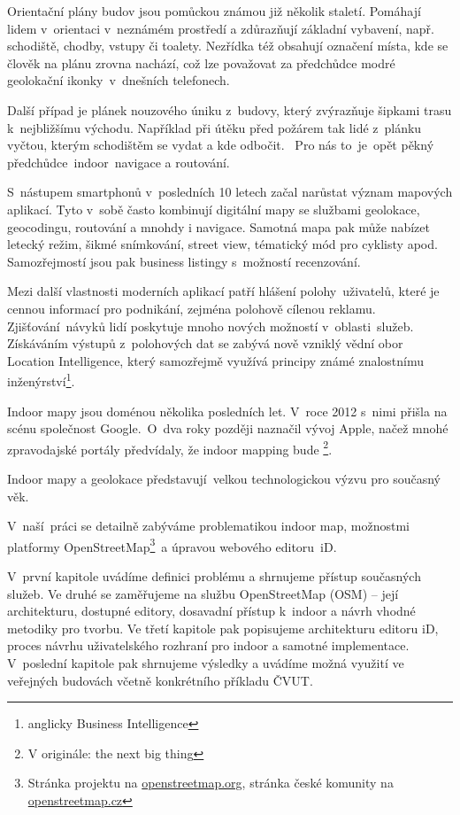 \begin{introduction}

Orientační plány budov jsou pomůckou známou již několik staletí. Pomáhají lidem v~orientaci v~neznámém prostředí a zdůrazňují základní vybavení, např. schodiště, chodby, vstupy či toalety. Nezřídka též obsahují označení místa, kde se člověk na plánu zrovna nachází, což lze považovat za předchůdce modré geolokační ikonky~v~dnešních telefonech.

Další případ je plánek nouzového úniku z~budovy, který zvýrazňuje šipkami trasu k~nejbližšímu východu. Například při útěku před požárem tak lidé z~plánku vyčtou, kterým schodištěm se vydat a kde odbočit. ~Pro nás to~je~opět pěkný předchůdce~indoor~navigace a routování.

S~nástupem smartphonů v~posledních 10 letech začal narůstat význam mapových aplikací. Tyto v~sobě často kombinují digitální mapy se službami geolokace, geocodingu, routování a mnohdy i navigace. Samotná mapa pak může nabízet letecký režim, šikmé snímkování, street view, tématický mód pro cyklisty apod. Samozřejmostí jsou pak business listingy s~možností recenzování.

Mezi další vlastnosti moderních aplikací patří hlášení polohy~uživatelů, které je cennou informací pro podnikání, zejména polohově cílenou reklamu. Zjišťování~návyků lidí poskytuje mnoho nových možností v~oblasti~služeb. Získáváním výstupů z~polohových dat se zabývá nově vzniklý vědní obor Location Intelligence, který samozřejmě využívá principy známé znalostnímu inženýrství\footnote{anglicky Business Intelligence}.

Indoor mapy jsou doménou několika posledních let. V~roce 2012 s~nimi přišla na scénu společnost Google\cite{zdroj1}.~O~dva roky později naznačil vývoj Apple, načež mnohé zpravodajské portály předvídaly\cite{zdroj2}, že indoor mapping bude \footnote{V originále: the next big thing}.

Indoor mapy a geolokace představují~velkou technologickou výzvu pro současný věk.

V~naší~práci se detailně zabýváme problematikou indoor map, možnostmi platformy OpenStreetMap\footnote{Stránka projektu na \href{http://openstreetmap.org}{openstreetmap.org}, stránka české komunity na \href{http://openstreetmap.cz}{openstreetmap.cz}}~a úpravou webového editoru~iD.

V~první kapitole uvádíme definici problému a shrnujeme přístup současných služeb. Ve druhé se zaměřujeme na službu OpenStreetMap (OSM) -- její architekturu, dostupné editory, dosavadní přístup k~indoor a návrh vhodné metodiky pro tvorbu. Ve třetí kapitole pak popisujeme architekturu editoru iD, proces návrhu uživatelského rozhraní pro indoor a samotné implementace. V~poslední kapitole pak shrnujeme výsledky a uvádíme možná využití ve veřejných budovách včetně konkrétního příkladu ČVUT.


\end{introduction}
